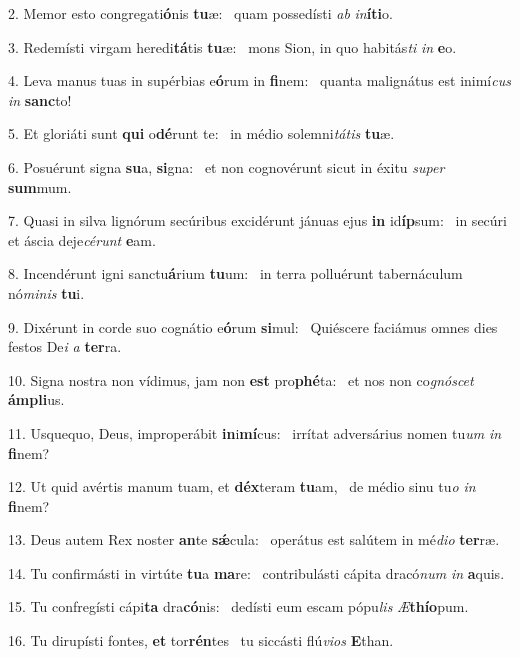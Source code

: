 2. Memor esto congregati\textbf{ó}nis \textbf{tu}æ: \ast\  quam possedísti \textit{ab} \textit{in}\textbf{í}\textbf{ti}o.\

3. Redemísti virgam heredi\textbf{tá}tis \textbf{tu}æ: \ast\  mons Sion, in quo habitás\textit{ti} \textit{in} \textbf{e}o.\

4. Leva manus tuas in supérbias e\textbf{ó}rum in \textbf{fi}nem: \ast\  quanta malignátus est inimí\textit{cus} \textit{in} \textbf{sanc}to!\

5. Et gloriáti sunt \textbf{qui} o\textbf{dé}runt te: \ast\  in médio solemni\textit{tá}\textit{tis} \textbf{tu}æ.\

6. Posuérunt signa \textbf{su}a, \textbf{si}gna: \ast\  et non cognovérunt sicut in éxitu \textit{su}\textit{per} \textbf{sum}mum.\

7. Quasi in silva lignórum secúribus excidérunt jánuas ejus \textbf{in} id\textbf{íp}sum: \ast\  in secúri et áscia deje\textit{cé}\textit{runt} \textbf{e}am.\

8. Incendérunt igni sanctu\textbf{á}rium \textbf{tu}um: \ast\  in terra polluérunt tabernáculum nó\textit{mi}\textit{nis} \textbf{tu}i.\

9. Dixérunt in corde suo cognátio e\textbf{ó}rum \textbf{si}mul: \ast\  Quiéscere faciámus omnes dies festos De\textit{i} \textit{a} \textbf{ter}ra.\

10. Signa nostra non vídimus, jam non \textbf{est} pro\textbf{phé}ta: \ast\  et nos non co\textit{gnó}\textit{scet} \textbf{ám}\textbf{pli}us.\

11. Usquequo, Deus, improperábit \textbf{in}i\textbf{mí}cus: \ast\  irrítat adversárius nomen tu\textit{um} \textit{in} \textbf{fi}nem?\

12. Ut quid avértis manum tuam, et \textbf{déx}teram \textbf{tu}am, \ast\  de médio sinu tu\textit{o} \textit{in} \textbf{fi}nem?\

13. Deus autem Rex noster \textbf{an}te \textbf{sǽ}cula: \ast\  operátus est salútem in mé\textit{di}\textit{o} \textbf{ter}ræ.\

14. Tu confirmásti in virtúte \textbf{tu}a \textbf{ma}re: \ast\  contribulásti cápita dracó\textit{num} \textit{in} \textbf{a}quis.\

15. Tu confregísti cápi\textbf{ta} dra\textbf{có}nis: \ast\  dedísti eum escam pópu\textit{lis} \textit{Æ}\textbf{thí}\textbf{o}pum.\

16. Tu dirupísti fontes, \textbf{et} tor\textbf{rén}tes \ast\  tu siccásti flú\textit{vi}\textit{os} \textbf{E}than.\


